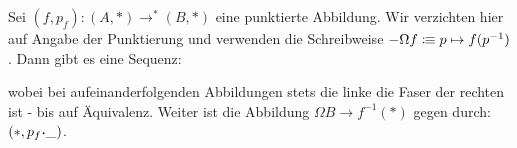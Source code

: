 \begin{theorem}[Fasersequenz]
  Sei $(f,p_f):(A,\ast)\to^\ast (B,\ast)$ eine punktierte Abbildung.
  Wir verzichten hier auf Angabe der Punktierung und verwenden die Schreibweise $-\Omega f\vcentcolon\mspace{-1.2mu}\equiv p\mapsto f(p^{-1})$.
  Dann gibt es eine Sequenz:
  \begin{center}
  \end{center}
  wobei bei aufeinanderfolgenden Abbildungen stets die linke die Faser der rechten ist - bis auf Äquivalenz.
  Weiter ist die Abbildung $\Omega B\to f^{-1}(\ast)$ gegen durch: $(\ast,p_f\kon\_)$.
\end{theorem}
